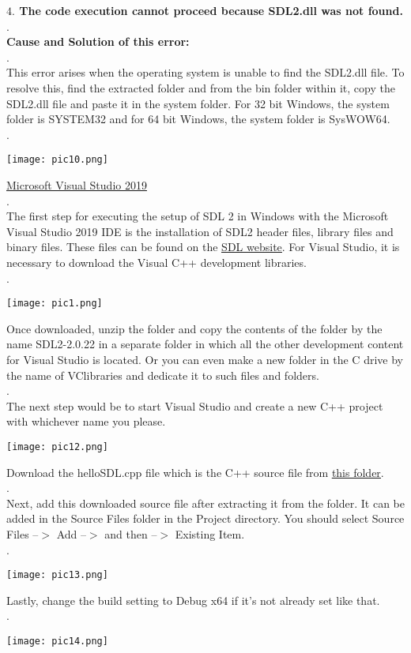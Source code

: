 \documentclass{article}
\begin{document}
\begin{flushleft}
		
		\textbf{$ 4. $ The code execution cannot proceed because SDL2.dll was not found.}\\.\\
		\textbf{Cause and Solution of this error:}\\.\\
		This error arises when the operating system is unable to find the SDL2.dll file. To resolve this, find the extracted folder and from the bin folder within it, copy the SDL2.dll file and paste it in the system folder. For 32 bit Windows, the system folder is SYSTEM32 and for 64 bit Windows, the system folder is SysWOW64.\\
		.\\
		\begin{center}
			\texttt{[image: pic10.png]}
		\end{center}
		\underline{Microsoft Visual Studio 2019}\\
		.\\
				The first step for executing the setup of SDL 2 in Windows with the Microsoft Visual Studio 2019 IDE is the installation of SDL2 header files, library files and binary files. These files can be found on the \href{http://www.libsdl.org/download-2.0.php}{\underline{SDL website}}. For Visual Studio, it is necessary to download the Visual C++ development libraries.\\
		.\\
		\begin{center}
			\texttt{[image: pic1.png]}
		\end{center}
		Once downloaded, unzip the folder and copy the contents of the folder by the name SDL2-2.0.22 in a separate folder in which all the other development content for Visual Studio is located. Or you can even make a new folder in the C drive by the name of VClibraries and dedicate it to such files and folders.\\
		.\\
		The next step would be to start Visual Studio and create a new C++ project with whichever name you please. 
		\begin{center}
			\texttt{[image: pic12.png]}
		\end{center}
		Download the helloSDL.cpp file which is the C++ source file from \href{https://lazyfoo.net/tutorials/SDL/01_hello_SDL/01_hello_SDL.zip}{\underline{this folder}}.  \\.\\
		Next, add this downloaded source file after extracting it from the folder. It can be added in the Source Files folder in the Project directory. You should select Source Files --$ > $ Add --$ > $ and then --$ > $ Existing Item.\\
		.\\
		\begin{center}
			\texttt{[image: pic13.png]}
		\end{center}
		 Lastly, change the build setting to Debug x64 if it's not already set like that. \\.\\
		 \begin{center}
		 	\texttt{[image: pic14.png]}
		 \end{center}
		

\end{flushleft}
\end{document}
